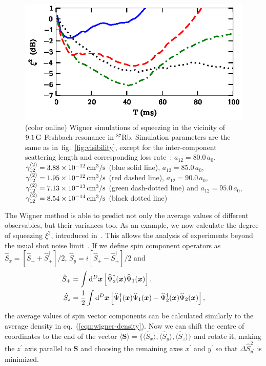 \documentclass[doublecol]{epl2}
\newcommand{\Rb}{$^{87}$Rb}
\newcommand{\figref}[1]{fig.~\ref{#1}}
\newcommand{\xvec}{\boldsymbol{x}}
\begin{document}
\begin{figure}
	\includegraphics[width=0.85\columnwidth]{ramsey_squeezing.eps}

	\caption[]{(color online)
	Wigner simulations of squeezing in the vicinity of $9.1\un{G}$ Feshbach resonance in \Rb.
	Simulation parameters are the same as in~\figref{fig:visibility},
	except for the inter-component scattering length and corresponding loss rate~\cite{Kaufman2009}:
	$a_{12} = 80.0\,a_0$, $\gamma^{(2)}_{12} = 3.88 \times 10^{-12}\un{cm^3/s}$ (blue solid line),
	$a_{12} = 85.0\,a_0$, $\gamma^{(2)}_{12} = 1.95 \times 10^{-12}\un{cm^3/s}$ (red dashed line),
	$a_{12} = 90.0\,a_0$, $\gamma^{(2)}_{12} = 7.13 \times 10^{-13}\un{cm^3/s}$ (green dash-dotted line) and
	$a_{12} = 95.0\,a_0$, $\gamma^{(2)}_{12} = 8.54 \times 10^{-14}\un{cm^3/s}$ (black dotted line)}

	\label{fig:squeezing}
\end{figure}

The Wigner method is able to predict not only the average values of different observables,
but their variances too.
As an example, we now calculate the degree of squeezing $\xi^2$, introduced in~\cite{Wineland1994,Sorensen2001}.
This allows the analysis of experiments beyond the usual shot noise limit~\cite{Riedel2010,Gross2010}.
If we define spin component operators as
$\hat{S}_{x} = [ \hat{S}_+ + \hat{S}_+^\dagger ] / 2 $,
$\hat{S}_{y} = i [ \hat{S}_+ - \hat{S}_+^\dagger ] / 2 $ and
\begin{equation}
\begin{split}
	\hat{S}_+ & = \int \upd^D\xvec \left[
		\widehat{\Psi}^\dagger_2 (\xvec) \widehat{\Psi}_1 (\xvec)
	\right], \\
	\hat{S}_z & = \frac{1}{2} \int \upd^D\xvec \left[
		\widehat{\Psi}^\dagger_1 (\xvec) \widehat{\Psi}_1 (\xvec)
		- \widehat{\Psi}^\dagger_2 (\xvec) \widehat{\Psi}_2 (\xvec)
	\right],
\end{split}
\end{equation}
the average values of spin vector components can be calculated similarly to the average density in
eq.~(\ref{eqn:wigner-density}).
Now we can shift the centre of coordinates to the end of the vector
$\langle \boldsymbol{S} \rangle = \{ \langle \hat{S}_x \rangle, \langle \hat{S}_y \rangle, \langle \hat{S}_z \rangle \}$
and rotate it, making the $z^\prime$ axis parallel to $\boldsymbol{S}$ and choosing the remaining axes $x^\prime$ and $y^\prime$ so that
$\Delta \hat{S}^2_{y^\prime} $ is minimized.
\end{document}
